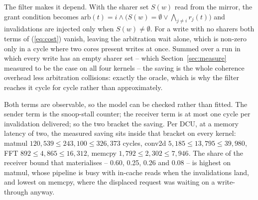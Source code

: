 The filter makes it depend. With the sharer set $S(w)$ read from the mirror,
the grant condition becomes $\mathrm{arb}(t) = i \wedge \big(S(w) = \emptyset
\vee \bigwedge\nolimits_{j \ne i} r_j(t)\big)$ and invalidations are injected only when
$S(w) \ne \emptyset$. For a write with no sharers both terms of (\ref{eq:cost})
vanish, leaving the arbitration wait alone, which is non-zero only in a cycle
where two cores present writes at once. Summed over a run in which every write
has an empty sharer set -- which Section~\ref{sec:measure} measured to be the
case on all four kernels -- the saving is the whole coherence overhead less
arbitration collisions: exactly the oracle, which is why the filter reaches it
cycle for cycle rather than approximately.

Both terms are observable, so the model can be checked rather than fitted. The
sender term is the snoop-stall counter; the receiver term is at most one cycle
per invalidation delivered; so the two bracket the saving. Per DCU, at a memory
latency of two, the measured saving sits inside that bracket on every kernel:
matmul $120{,}539 \le 243{,}100 \le 326{,}373$ cycles, conv2d $5{,}185 \le
13{,}795 \le 39{,}980$, FFT $892 \le 4{,}865 \le 16{,}312$, memcpy $1{,}792 \le
2{,}302 \le 7{,}946$. The share of the receiver bound that materialises -- 0.60,
0.25, 0.26 and 0.08 -- is highest on matmul, whose pipeline is busy with in-cache
reads when the invalidations land, and lowest on memcpy, where the displaced
request was waiting on a write-through anyway.
